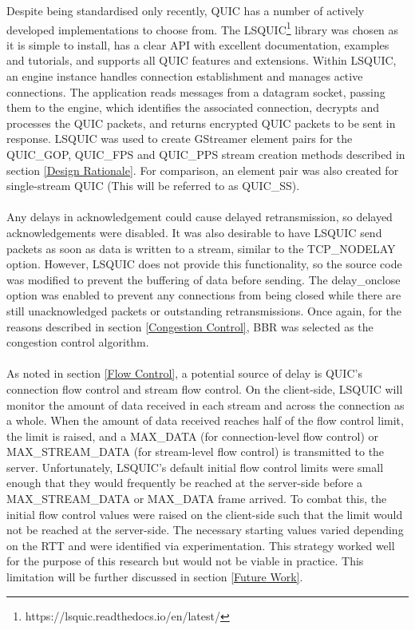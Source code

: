 \documentclass{mpaper}
\begin{document}
\noindent Despite being standardised only recently, QUIC has a number of actively developed implementations to choose from. The LSQUIC\footnote{https://lsquic.readthedocs.io/en/latest/} library was chosen as it is simple to install, has a clear API with excellent documentation, examples and tutorials, and supports all QUIC features and extensions. Within LSQUIC, an engine instance handles connection establishment and manages active connections. The application reads messages from a datagram socket, passing them to the engine, which identifies the associated connection, decrypts and processes the QUIC packets, and returns encrypted QUIC packets to be sent in response. LSQUIC was used to create GStreamer element pairs for the QUIC\_GOP, QUIC\_FPS and QUIC\_PPS stream creation methods described in section \ref{Design Rationale}. For comparison, an element pair was also created for single-stream QUIC (This will be referred to as QUIC\_SS). 
\\\\
Any delays in acknowledgement could cause delayed retransmission, so delayed acknowledgements were disabled. It was also desirable to have LSQUIC send packets as soon as data is written to a stream, similar to the TCP\_NODELAY option. However, LSQUIC does not provide this functionality, so the source code was modified to prevent the buffering of data before sending. The delay\_onclose option was enabled to prevent any connections from being closed while there are still unacknowledged packets or outstanding retransmissions. Once again, for the reasons described in section \ref{Congestion Control}, BBR was selected as the congestion control algorithm.
\\\\
As noted in section \ref{Flow Control}, a potential source of delay is QUIC's connection flow control and stream flow control. On the client-side, LSQUIC will monitor the amount of data received in each stream and across the connection as a whole. When the amount of data received reaches half of the flow control limit, the limit is raised, and a MAX\_DATA (for connection-level flow control) or MAX\_STREAM\_DATA (for stream-level flow control) is transmitted to the server. Unfortunately, LSQUIC's default initial flow control limits were small enough that they would frequently be reached at the server-side before a MAX\_STREAM\_DATA or MAX\_DATA frame arrived. To combat this, the initial flow control values were raised on the client-side such that the limit would not be reached at the server-side. The necessary starting values varied depending on the RTT and were identified via experimentation. This strategy worked well for the purpose of this research but would not be viable in practice. This limitation will be further discussed in section \ref{Future Work}.
\end{document}

